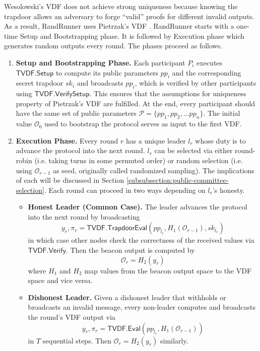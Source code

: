 \documentclass[letterpaper,twocolumn,10pt]{article}
\theoremstyle{definition}
\theoremstyle{remark}
\begin{document}
Wesolowski’s VDF \cite{wesolowski2019efficient} does not achieve strong uniqueness because knowing the trapdoor allows an adversary to forge ``valid'' proofs for different invalid outputs. As a result, RandRunner uses Pietrzak's VDF \cite{pietrzak2018simple}. RandRunner starts with a one-time Setup and Bootstrapping phase. It is followed by Execution phase which generates random outputs every round. The phases proceed as follows.
\begin{enumerate}
    \item \textbf{Setup and Bootstrapping Phase.} Each participant $P_i$ executes $\mathsf{TVDF.Setup}$ to compute its public parameters $pp_i$ and the corresponding secret trapdoor $sk_i$ and broadcasts $pp_i$, which is verified by other participants using $\mathsf{TVDF.VerifySetup}$. This ensures that the assumptions for uniqueness property of Pietrzak’s VDF \cite{pietrzak2018simple} are fulfilled. At the end, every participant should have the same set of public parameters $\mathcal{P} = \{ pp_1, pp_2, \ldots pp_n \}$. The initial value $\mathcal{O}_0$ used to bootstrap the protocol serves as input to the first VDF.
    
    \item \textbf{Execution Phase.} Every round $r$ has a unique leader $l_r$ whose duty is to advance the protocol into the next round. $l_r$ can be selected via either round-robin (i.e. taking turns in some permuted order) or random selection (i.e. using $\mathcal{O}_{r - 1}$ as seed, originally called randomized sampling). The implications of each will be discussed in Section \ref{subsubsection:public-committee-selection}. Each round can proceed in two ways depending on $l_r$'s honesty.
    \begin{itemize}
        \item \textbf{Honest Leader (Common Case).} The leader advances the protocol into the next round by broadcasting
        $$y_r, \pi_r = \mathsf{TVDF.TrapdoorEval}(pp_{l_r}, H_1(\mathcal{O}_{r - 1}), sk_{l_r})$$
        in which case other nodes check the correctness of the received values via $\mathsf{TVDF.Verify}$. Then the beacon output is computed by
        $$\mathcal{O}_r = H_2(y_r)$$
        where $H_1$ and $H_2$ map values from the beacon output space to the VDF space and vice versa.
        \item \textbf{Dishonest Leader.} Given a dishonest leader that withholds or broadcasts an invalid message, every non-leader computes and broadcasts the round's VDF output via
        $$y_r, \pi_r = \mathsf{TVDF.Eval}(pp_{l_r}, H_1(\mathcal{O}_{r - 1}))$$
        in $T$ sequential steps. Then $\mathcal{O}_r = H_2(y_r)$ similarly.
    \end{itemize}
\end{enumerate}
\end{document}
